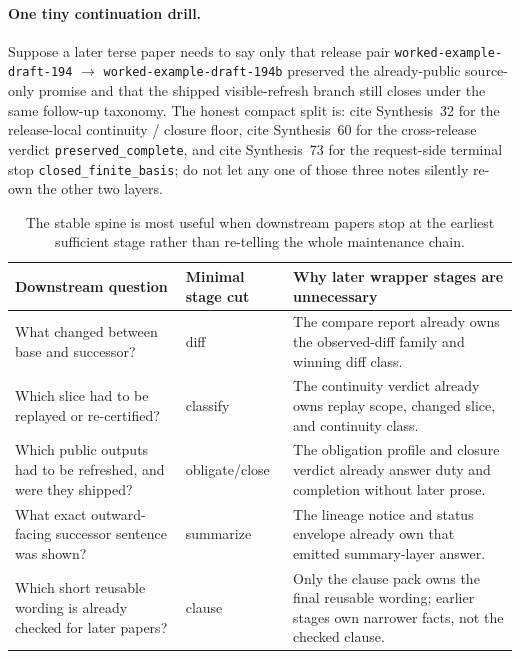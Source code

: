 \documentclass[11pt]{article}
\begin{document}
\paragraph{One tiny continuation drill.} Suppose a later terse paper needs to say only that release pair \texttt{worked-example-draft-194} $\to$ \texttt{worked-example-draft-194b} preserved the already-public source-only promise and that the shipped visible-refresh branch still closes under the same follow-up taxonomy. The honest compact split is: cite Synthesis~32 for the release-local continuity / closure floor, cite Synthesis~60 for the cross-release verdict \texttt{preserved\_complete}, and cite Synthesis~73 for the request-side terminal stop \texttt{closed\_finite\_basis}; do not let any one of those three notes silently re-own the other two layers.\cite{series:publicrequestcarryforward,series:publicrequestresponsepacketrefreshresponsepacketclosureverdicts,series:workedexample}

\begin{table}[t]
\centering
\small
\begin{tabularx}{\linewidth}{@{}l l X@{}}
\toprule
Downstream question & Minimal stage cut & Why later wrapper stages are unnecessary \\
\midrule
What changed between base and successor? & \textsf{diff} & The compare report already owns the observed-diff family and winning diff class. \\
Which slice had to be replayed or re-certified? & \textsf{classify} & The continuity verdict already owns replay scope, changed slice, and continuity class. \\
Which public outputs had to be refreshed, and were they shipped? & \textsf{obligate}/\textsf{close} & The obligation profile and closure verdict already answer duty and completion without later prose. \\
What exact outward-facing successor sentence was shown? & \textsf{summarize} & The lineage notice and status envelope already own that emitted summary-layer answer. \\
Which short reusable wording is already checked for later papers? & \textsf{clause} & Only the clause pack owns the final reusable wording; earlier stages own narrower facts, not the checked clause. \\
\bottomrule
\end{tabularx}
\caption{The stable spine is most useful when downstream papers stop at the earliest sufficient stage rather than re-telling the whole maintenance chain.}
\label{tab:minimal-stage-cut}
\end{table}
\end{document}
